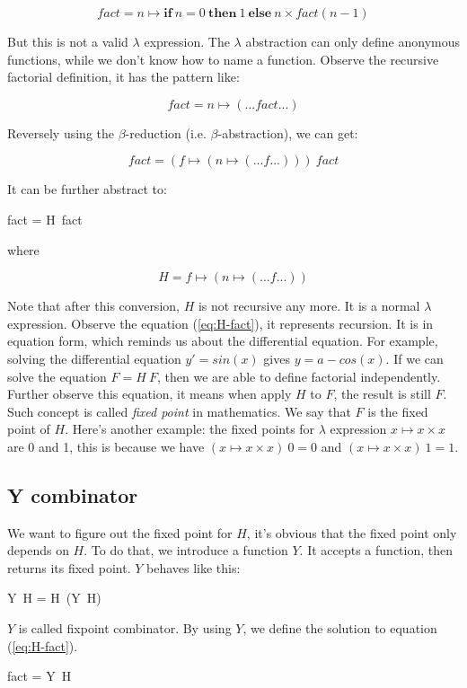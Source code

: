 \documentclass{article}
\begin{document}
\[
fact = n \mapsto \textbf{if}\ n = 0\ \textbf{then}\ 1\ \textbf{else}\ n \times fact (n - 1)
\]

But this is not a valid $\lambda$ expression. The $\lambda$ abstraction can only define anonymous functions, while we don't know how to name a function. Observe the recursive factorial definition, it has the pattern like:

\[
fact = n \mapsto (... fact ...)
\]

Reversely using the $\beta$-reduction (i.e. $\beta$-abstraction), we can get:

\[
fact = (f \mapsto (n \mapsto (... f ...)))\ fact
\]

It can be further abstract to:

\be
fact = H\ fact
\label{eq:H-fact}
\ee

where

\[
H = f \mapsto (n \mapsto (... f ...))
\]

Note that after this conversion, $H$ is not recursive any more. It is a normal $\lambda$ expression. Observe the equation (\ref{eq:H-fact}), it represents recursion. It is in equation form, which reminds us about the differential equation. For example, solving the differential equation $y' = sin(x)$ gives $y = a - cos(x)$. If we can solve the equation $F = H\ F$, then we are able to define factorial independently. Further observe this equation, it means when apply $H$ to $F$, the result is still $F$. Such concept is called {\em fixed point} in mathematics. We say that $F$ is the fixed point of $H$. Here's another example: the fixed points for $\lambda$ expression $x \mapsto x \times x$ are 0 and 1, this is because we have $(x \mapsto x \times x)\ 0 = 0$ and $(x \mapsto x \times x)\ 1 = 1$.

\subsection{Y combinator}

We want to figure out the fixed point for $H$, it's obvious that the fixed point only depends on $H$. To do that, we introduce a function $Y$. It accepts a function, then returns its fixed point. $Y$ behaves like this:

\be
Y\ H = H\ (Y\ H)
\label{eq:Y-H}
\ee

$Y$ is called fixpoint combinator. By using $Y$, we define the solution to equation (\ref{eq:H-fact}).

\be
fact = Y\ H
\label{eq:fact-in-Y}
\ee
\end{document}
